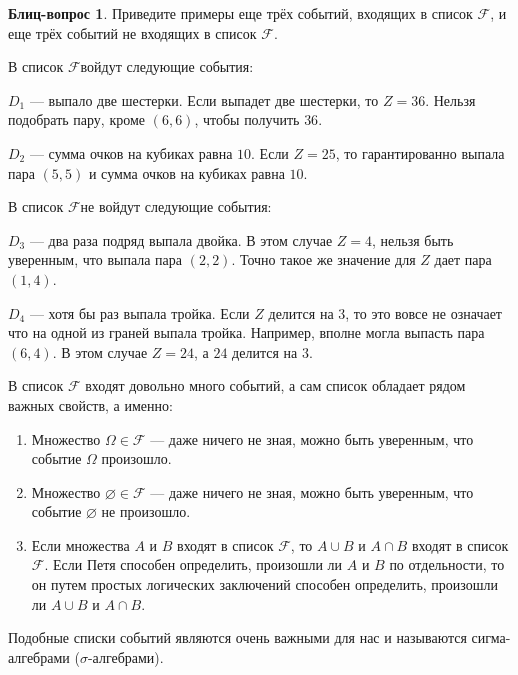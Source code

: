 \documentclass[pdftex, 12pt, a4paper]{article}
\def\F{\ensuremath{\mathcal{F}}} %
\def \Om{\Omega}
\theoremstyle{definition} %
\numberwithin{problem}{section}
\newtheorem{blits}{Блиц-вопрос}
\numberwithin{blits}{section}
\begin{document}
\begin{blits}
Приведите примеры еще трёх событий, входящих в список \F, и еще трёх событий не входящих в список \F.
\begin{blitssol}
В список \F войдут следующие события:

$D_1$ --- выпало две шестерки. Если выпадет две шестерки, то $Z=36$. Нельзя подобрать пару, кроме $(6,6)$, чтобы получить $36$.

$D_2$ --- сумма очков на кубиках равна $10$. Если $Z=25$, то гарантированно выпала пара $(5,5)$ и сумма очков на кубиках равна $10$.

В список \F не войдут следующие события:

$D_3$ --- два раза подряд выпала двойка. В этом случае $Z=4$, нельзя быть уверенным, что выпала пара $(2,2)$. Точно такое же значение для $Z$ дает пара $(1,4)$.

$D_4$ --- хотя бы раз выпала тройка. Если $Z$ делится на 3, то это вовсе не означает что на одной из граней выпала тройка. Например, вполне могла выпасть пара $(6,4)$. В этом случае $Z=24$, а $24$ делится на $3$.

\end{blitssol}
\end{blits}

В список $\F$ входят довольно много событий, а сам список обладает рядом важных свойств, а именно:

\begin{enumerate}
\item  Множество $\Om \in \F$ --- даже ничего не зная, можно быть уверенным, что событие $\Om$ произошло.

\item  Множество $\varnothing \in \mathcal{F}$ --- даже ничего не зная, можно быть уверенным, что событие $\varnothing$ не произошло.

\item  Если множества $A$ и $B$ входят в список $\F$, то $A\cup B$ и $A\cap B$ входят в список $\F$. Если Петя способен определить, произошли ли $A$ и $B$ по отдельности, то он путем простых логических заключений способен определить, произошли ли $A\cup B$ и $A\cap B$.

\end{enumerate}

Подобные списки событий являются очень важными для нас и называются сигма-алгебрами ($\sigma$-алгебрами).
\end{document}
